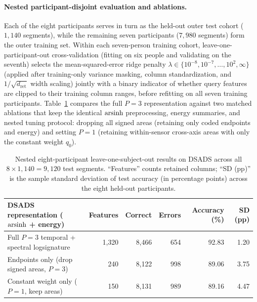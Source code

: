 \paragraph{Nested participant-disjoint evaluation and ablations.}
Each of the eight participants serves in turn as the held-out outer test cohort
(\(1{,}140\) segments), while the remaining seven participants (\(7{,}980\)
segments) form the outer training set. Within each seven-person training cohort,
leave-one-participant-out cross-validation (fitting on six people and validating
on the seventh) selects the mean-squared-error ridge penalty
\(\lambda \in \{10^{-8}, 10^{-7}, \ldots, 10^2, \infty\}\) (applied after
training-only variance masking, column standardization, and \(1/\sqrt{d_{\mathrm{ret}}}\)
width scaling) jointly with a binary indicator of whether query features are
clipped to their training column ranges, before refitting on all seven training
participants. Table~\ref{tab:dsads} compares the full \(P=3\) representation
against two matched ablations that keep the identical \(\operatorname{arsinh}\) preprocessing,
energy summaries, and nested tuning protocol: dropping all signed areas (retaining
only coded endpoints and energy) and setting \(P = 1\) (retaining within-sensor
cross-axis areas with only the constant weight \(q_0\)).

\begin{table}[ht]
\centering
\begin{tabular}{@{}lrrrrr@{}}
\toprule
DSADS representation (\(\operatorname{arsinh}\) + energy) & Features & Correct & Errors & Accuracy (\%) & SD (pp) \\
\midrule
Full \(P=3\) temporal + spectral logsignature & 1,320 & 8,466 & 654 & 92.83 & 1.20 \\
Endpoints only (drop signed areas, \(P=3\)) & 240 & 8,122 & 998 & 89.06 & 3.75 \\
Constant weight only (\(P=1\), keep areas) & 150 & 8,131 & 989 & 89.16 & 4.47 \\
\bottomrule
\end{tabular}
\caption{Nested eight-participant leave-one-subject-out results on DSADS across
all \(8 \times 1{,}140 = 9{,}120\) test segments. ``Features'' counts retained
columns; ``SD (pp)'' is the sample standard deviation of test accuracy (in
percentage points) across the eight held-out participants.}
\label{tab:dsads}
\end{table}

